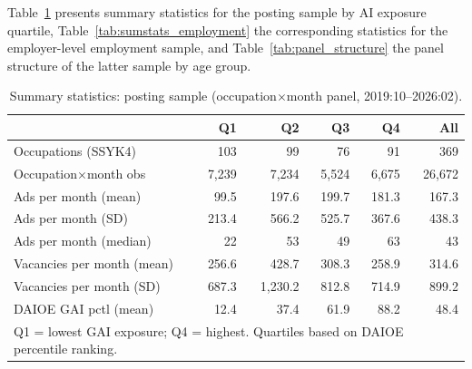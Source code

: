 \documentclass[preprint,12pt,authoryear]{elsarticle}
\begin{document}
Table~\ref{tab:sumstats_postings} presents summary statistics for the posting sample by AI exposure quartile, Table~\ref{tab:sumstats_employment} the corresponding statistics for the employer-level employment sample, and Table~\ref{tab:panel_structure} the panel structure of the latter sample by age group.

\begin{table}[htbp]
\centering
\caption{Summary statistics: posting sample (occupation$\times$month panel, 2019:10--2026:02).}
\label{tab:sumstats_postings}
\footnotesize
\begin{tabular}{@{}lrrrrr@{}}
\toprule
 & Q1 & Q2 & Q3 & Q4 & All \\
\midrule
Occupations (SSYK4) & 103 & 99 & 76 & 91 & 369 \\
Occupation$\times$month obs & 7,239 & 7,234 & 5,524 & 6,675 & 26,672 \\[4pt]
Ads per month (mean) & 99.5 & 197.6 & 199.7 & 181.3 & 167.3 \\
Ads per month (SD) & 213.4 & 566.2 & 525.7 & 367.6 & 438.3 \\
Ads per month (median) & 22 & 53 & 49 & 63 & 43 \\[4pt]
Vacancies per month (mean) & 256.6 & 428.7 & 308.3 & 258.9 & 314.6 \\
Vacancies per month (SD) & 687.3 & 1,230.2 & 812.8 & 714.9 & 899.2 \\[4pt]
DAIOE GAI pctl (mean) & 12.4 & 37.4 & 61.9 & 88.2 & 48.4 \\
\bottomrule
\multicolumn{6}{l}{\scriptsize Q1 = lowest GAI exposure; Q4 = highest. Quartiles based on DAIOE percentile ranking.}
\end{tabular}
\end{table}
\end{document}
